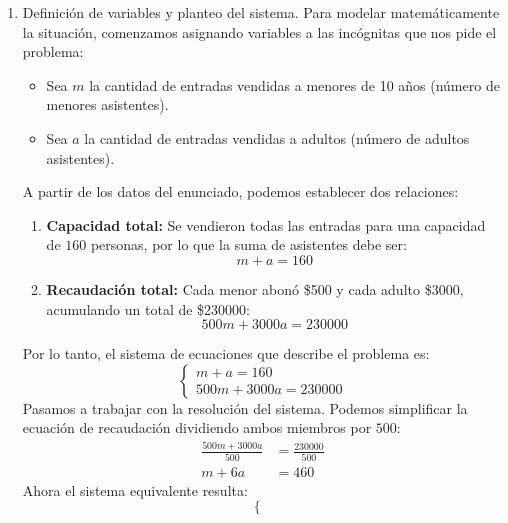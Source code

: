 \documentclass[11pt]{article}
\begin{document}
\begin{enumerate}
\begin{enumerate}
\begin{align*}
            &-5=K
        \end{align*}
        Y así obtenemos el valor de $K$ que buscábamos
    \end{enumerate}
    \item Definición de variables y planteo del sistema. Para modelar matemáticamente la situación, comenzamos asignando variables a las incógnitas que nos pide el problema:
        \begin{itemize}
            \item Sea $m$ la cantidad de entradas vendidas a menores de 10 años (número de menores asistentes).
            \item Sea $a$ la cantidad de entradas vendidas a adultos (número de adultos asistentes).
        \end{itemize}
    A partir de los datos del enunciado, podemos establecer dos relaciones:
    \begin{enumerate}
        \item \textbf{Capacidad total:} Se vendieron todas las entradas para una capacidad de $160$ personas, por lo que la suma de asistentes debe ser:
        \begin{equation}
            m + a = 160
        \end{equation}
        \item \textbf{Recaudación total:} Cada menor abonó \$500 y cada adulto \$3000, acumulando un total de \$230000:
        \begin{equation}
            500m + 3000a = 230000
        \end{equation}
    \end{enumerate}
    Por lo tanto, el sistema de ecuaciones que describe el problema es:
    \begin{equation*}
        \begin{cases}
            m + a = 160 \\
            500m + 3000a = 230000
        \end{cases}
    \end{equation*}
    Pasamos a trabajar con la resolución del sistema. Podemos simplificar la ecuación de recaudación dividiendo ambos miembros por $500$:
    \begin{align*}
        \frac{500m + 3000a}{500} &= \frac{230000}{500} \\
        m + 6a &= 460
    \end{align*}
    Ahora el sistema equivalente resulta:
    \begin{equation*}
        \begin{cases}

\end{cases}
\end{equation*}
\end{enumerate}
\end{document}
